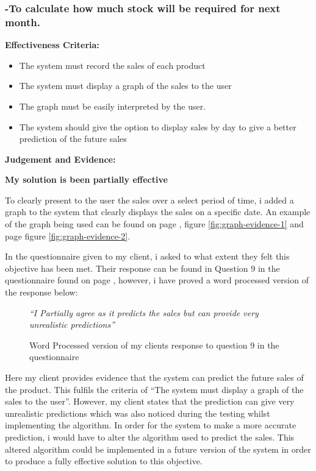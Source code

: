\pagebreak
\subsubsection{-To calculate how much stock will be required for next month.}

\textbf{Effectiveness Criteria:}\newline
\begin{itemize}
	\item{The system must record the sales of each product}
	\item{The system must display a graph of the sales to the user}
	\item{The graph must be easily interpreted by the user.}
	\item{The system should give the option to display sales by day to give a better prediction of the future sales}
\end{itemize}

\textbf{Judgement and Evidence:} \newline

\textbf{\large{My solution is been partially effective}}

To clearly present to the user the sales over a select period of time, i added a graph to the system that clearly displays the sales on a specific date. An example of the graph being used can be found on page \pageref{fig:graph-evidence-1}, figure \ref{fig:graph-evidence-1} and page \pageref{fig:graph-evidence-2} figure \ref{fig:graph-evidence-2}.

In the questionnaire given to my client, i asked to what extent they felt this objective has been met. Their response can be found in Question 9 in the questionnaire found on page \pageref{Client-Q1}, however, i have proved a word processed version of the response below:

\begin{figure}[H]
\caption{Word Processed version of my clients response to question 9 in the questionnaire} \label{client-evidence-Q1}
\vspace{3mm}
\textit{\large{``I Partially agree as it predicts the sales but can provide very unrealistic predictions''}}
\vspace{3mm}
\end{figure}

Here my client provides evidence that the system can predict the future sales of the product. This fulfils the criteria of ``The system must display a graph of the sales to the user''. However, my client states that the prediction can give very unrealistic predictions which was also noticed during the testing whilst implementing the algorithm. In order for the system to make a more accurate prediction, i would have to alter the algorithm used to predict the sales. This altered algorithm could be implemented in a future version of the system in order to produce a fully effective solution to this objective.

